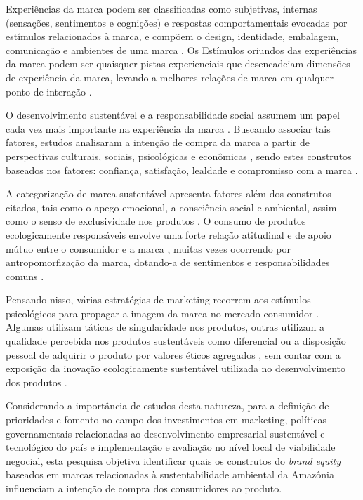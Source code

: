 Experiências da marca podem ser classificadas como subjetivas, internas (sensações, sentimentos e cognições) e respostas comportamentais evocadas por estímulos relacionados à marca, e compõem o design, identidade, embalagem, comunicação e ambientes de uma marca \cite{Ramaseshan2014ConnectingRelationships}. Os Estímulos oriundos das experiências da marca podem ser quaisquer pistas experienciais que desencadeiam dimensões de experiência da marca, levando a melhores relações de marca em qualquer ponto de interação \cite{Jeon2017TheEquity}. 

O desenvolvimento sustentável e a responsabilidade social assumem um papel cada vez mais importante na experiência da marca \cite{Ketprapakorn2019}. Buscando associar tais fatores, estudos analisaram a intenção de compra da marca a partir de perspectivas culturais, sociais, psicológicas e econômicas \cite{Cheah2015AntecedentsBrands,Kautish2020InfluenceConsumption,Dhaliwal2020TheAgenda}, sendo estes construtos baseados nos fatores: confiança, satisfação, lealdade e compromisso com a marca \cite{Kim2012DoBrand,Zollo2020UnpackingExperience}. 

A categorização de marca sustentável apresenta fatores além dos construtos citados, tais como o apego emocional, a consciência social e ambiental, assim como o senso de exclusividade nos produtos \cite{Long2018366,Chen20191,Ranfagni2022LuxuryOpportunities}. O consumo de produtos ecologicamente responsáveis envolve uma forte relação atitudinal e de apoio mútuo entre o consumidor e a marca \cite{Cheng2022TheAttachment}, muitas vezes ocorrendo por antropomorfização da marca, dotando-a de sentimentos e responsabilidades comuns \cite{Langner2015IsLove,Schmid2019BrandLifecycle}.

Pensando nisso, várias estratégias de marketing recorrem aos estímulos psicológicos para propagar a imagem da marca no mercado consumidor \cite{Yoo2017AnEquity:}. Algumas utilizam táticas de singularidade nos produtos, outras utilizam a qualidade percebida nos produtos sustentáveis como diferencial \cite{Liu2014ThePreference} ou a disposição pessoal de adquirir o produto por valores éticos agregados \cite{Pero2020SustainabilityBrands}, sem contar com a exposição da inovação ecologicamente sustentável utilizada no desenvolvimento dos produtos \cite{Nedergaard2013SustainableInnovation}.

Considerando a importância de estudos desta natureza, para a definição de prioridades e fomento no campo dos investimentos em marketing, políticas governamentais relacionadas ao desenvolvimento empresarial sustentável e tecnológico do país e implementação e avaliação no nível local de viabilidade negocial, esta pesquisa objetiva identificar quais os construtos do \textit{brand equity} baseados em marcas relacionadas à sustentabilidade ambiental da Amazônia influenciam a intenção de compra dos consumidores ao produto.

